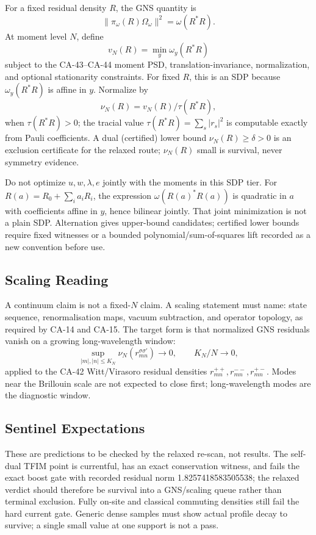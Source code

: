 For a fixed residual density \(R\), the GNS quantity is
\[
  \|\pi_\omega(R)\Omega_\omega\|^2=\omega(R^*R).
\]
At moment level \(N\), define
\[
  v_N(R)=\min_y \omega_y(R^*R)
\]
subject to the CA-43--CA-44 moment PSD, translation-invariance, normalization,
and optional stationarity constraints.  For fixed \(R\), this is an SDP because
\(\omega_y(R^*R)\) is affine in \(y\).  Normalize by
\[
  \nu_N(R)=v_N(R)/\tau(R^*R),
\]
when \(\tau(R^*R)>0\); the tracial value \(\tau(R^*R)=\sum_s|r_s|^2\) is
computable exactly from Pauli coefficients.  A dual (certified) lower bound
\(\nu_N(R)\ge\delta>0\) is an exclusion certificate for the relaxed route;
\(\nu_N(R)\) small is survival, never symmetry evidence.

Do not optimize \(u,w,\lambda,e\) jointly with the moments in this SDP tier.
For \(R(a)=R_0+\sum_i a_iR_i\), the expression
\(\omega(R(a)^*R(a))\) is quadratic in \(a\) with coefficients affine in \(y\),
hence bilinear jointly.  That joint minimization is not a plain SDP.
Alternation gives upper-bound candidates; certified lower bounds require fixed
witnesses or a bounded polynomial/sum-of-squares lift recorded as a new
convention before use.

\subsection{Scaling Reading}

A continuum claim is not a fixed-\(N\) claim.  A scaling statement must name:
state sequence, renormalisation maps, vacuum subtraction, and operator
topology, as required by CA-14 and CA-15.  The target form is that normalized
GNS residuals vanish on a growing long-wavelength window:
\[
  \sup_{|m|,|n|\le K_N}
  \nu_N(r^{\sigma\sigma'}_{mn})\to0,
  \qquad K_N/N\to0,
\]
applied to the CA-42 Witt/Virasoro residual densities
\(r^{++}_{mn},r^{--}_{mn},r^{+-}_{mn}\).  Modes near the Brillouin scale are
not expected to close first; long-wavelength modes are the diagnostic window.

\subsection{Sentinel Expectations}

These are predictions to be checked by the relaxed re-scan, not results.  The
self-dual TFIM point is currentful, has an exact conservation witness, and
fails the exact boost gate with recorded residual norm 1.8257418583505538; the
relaxed verdict should therefore be survival into a GNS/scaling queue rather
than terminal exclusion.  Fully on-site and classical commuting densities
still fail the hard current gate.  Generic dense samples must show actual
profile decay to survive; a single small value at one support is not a pass.

